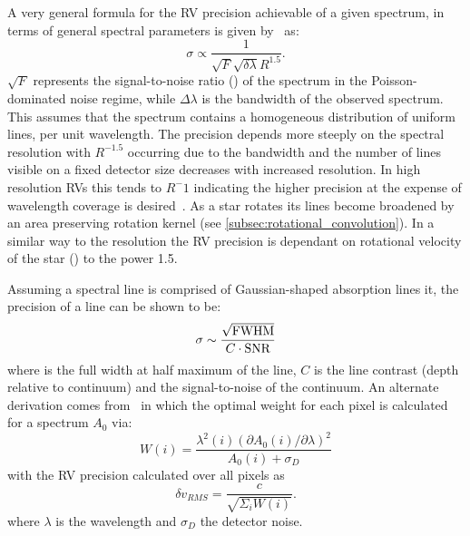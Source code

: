 A very general formula for the {RV} precision achievable of a given spectrum, in terms of general spectral parameters is given by~\citet{hatzes_spectrograph_1992} as:
\begin{equation}
\sigma \propto \frac{1}{\sqrt{F} \sqrt{\delta \lambda} R^{1.5}}.
\end{equation}
$\sqrt{F}$ represents the signal-to-noise ratio (\snr{}) of the spectrum in the {Poisson}-dominated noise regime, while $\Delta \lambda$ is the bandwidth of the observed spectrum.
This assumes that the spectrum contains a homogeneous distribution of uniform lines, per unit wavelength.
The precision depends more steeply on the spectral resolution with $R^{-1.5}$ occurring due to the bandwidth and the number of lines visible on a fixed detector size decreases with increased resolution.
In high resolution {RV}s this tends to $R^-{1}$ indicating the higher precision at the expense of wavelength coverage is desired~\citet{hatzes_spectrograph_1992}.
As a star rotates its lines become broadened by an area preserving rotation kernel (see \cref{subsec:rotational_convolution}).
In a similar way to the resolution the {RV} precision is dependant on rotational velocity of the star (\Vsini) to the power 1.5.

Assuming a spectral line is comprised of Gaussian-shaped absorption lines it, the precision of a line can be shown to be:
\begin{equation}
    \sigma\sim\frac{\sqrt{\textrm{FWHM}{}}}{C \cdot \textrm{SNR}}
\end{equation}
where \fwhm{} is the full width at half maximum of the line, $C$ is the line contrast (depth relative to continuum) and \snr{} the signal-to-noise of the continuum.
An alternate derivation comes from~\citet{bouchy_fundamental_2001} in which the optimal weight for each pixel is calculated for a spectrum $A_0$ via:
\begin{equation}
    W(i) = \frac{\lambda^{2}(i) {(\partial A_0(i)/\partial\lambda)}^{2}}{A_0(i) + \sigma_D} \label{eqn:pixel_weigth}
\end{equation}
with the {RV} precision calculated over all pixels as
\begin{equation}
    \delta v_{RMS} = \frac{c}{\sqrt{\Sigma_i W(i)}}.
\end{equation}
where $\lambda$ is the wavelength and $\sigma_D$ the detector noise.

